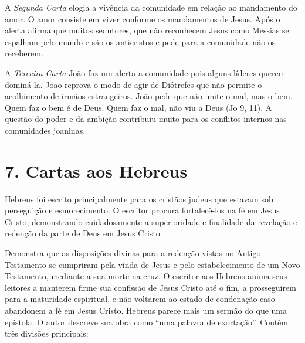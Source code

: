 \documentclass[
]{book}
\begin{document}
A \emph{Segunda Carta} elogia a vivência da comunidade em relação ao mandamento do amor. O amor consiste em viver conforme os mandamentos de Jesus. Após o alerta afirma que muitos sedutores, que não reconhecem Jesus como Messias se espalham pelo mundo e são os anticristos e pede para a comunidade não os receberem.

A \emph{Terceira Carta} João faz um alerta a comunidade pois alguns líderes querem dominá-la. Joao reprova o modo de agir de Diótrefes que não permite o acolhimento de irmãos estrangeiros. João pede que não imite o mal, mas o bem. Quem faz o bem é de Deus. Quem faz o mal, não viu a Deus (Jo 9, 11). A questão do poder e da ambição contribuiu muito para os conflitos internos nas comunidades joaninas.

\hypertarget{cartas-aos-hebreus}{%
\section*{7. Cartas aos Hebreus}\label{cartas-aos-hebreus}}

Hebreus foi escrito principalmente para os cristãos judeus que estavam sob perseguição e esmorecimento. O escritor procura fortalecê-los na fé em Jesus Cristo, demonstrando cuidadosamente a superioridade e finalidade da revelação e redenção da parte de Deus em Jesus Cristo.

Demonstra que as disposições divinas para a redenção vistas no Antigo Testamento se cumpriram pela vinda de Jesus e pelo estabelecimento de um Novo Testamento, mediante a sua morte na cruz. O escritor aos Hebreus anima seus leitores a manterem firme sua confissão de Jesus Cristo até o fim, a prosseguirem para a maturidade espiritual, e não voltarem ao estado de condenação caso abandonem a fé em Jesus Cristo. Hebreus parece mais um sermão do que uma epístola. O autor descreve sua obra como ``uma palavra de exortação''. Contêm três divisões principais:
\end{document}
